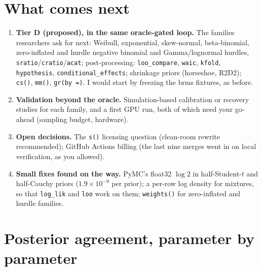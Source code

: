 \documentclass[11pt]{article}
\newcommand{\code}[1]{\texttt{#1}}
\begin{document}
\section{What comes next}
\label{sec:next}

\begin{enumerate}
\item \textbf{Tier D (proposed), in the same oracle-gated loop.} The families researchers ask for next: Weibull,
  exponential, skew-normal, beta-binomial, zero-inflated and hurdle negative binomial and Gamma/lognormal hurdles,
  \code{sratio}/\code{cratio}/\code{acat}; post-processing: \code{loo\_compare}, \code{waic}, \code{kfold},
  \code{hypothesis}, \code{conditional\_effects}; shrinkage priors (horseshoe, R2D2); \code{cs()}, \code{mm()},
  \code{gr(by =)}. I would start by freezing the brms fixtures, as before.
\item \textbf{Validation beyond the oracle.} Simulation-based calibration or recovery studies for each family, and a
  first GPU run, both of which need your go-ahead (sampling budget, hardware).
\item \textbf{Open decisions.} The \code{s()} licensing question (clean-room rewrite recommended); GitHub Actions
  billing (the last nine merges went in on local verification, as you allowed).
\item \textbf{Small fixes found on the way.} PyMC's float32 $\log 2$ in half-Student-$t$ and half-Cauchy priors
  ($1.9\times10^{-9}$ per prior); a per-row log density for mixtures, so that \code{log\_lik} and \code{loo} work on them;
  \code{weights()} for zero-inflated and hurdle families.
\end{enumerate}

\appendix
\section{Posterior agreement, parameter by parameter}
\end{document}
